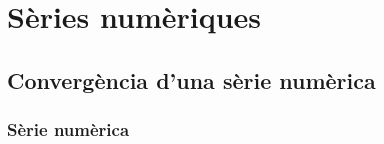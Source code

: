 \documentclass[../Apunts.tex]{subfiles}
\begin{document}
\chapter{Sèries numèriques}
	\section{Convergència d'una sèrie numèrica}
	\subsection{Sèrie numèrica}
	\begin{definition}
		
	\end{definition}
\end{document}
